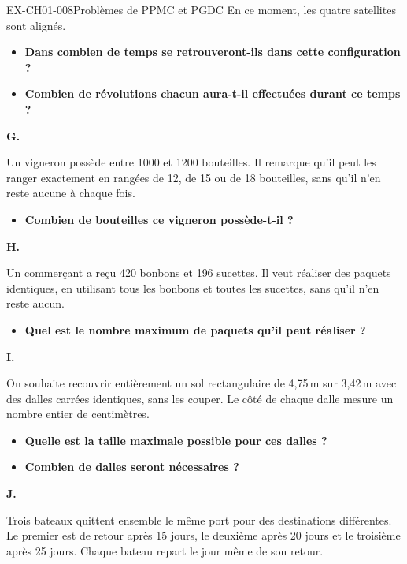 \begin{exercice}{EX-CH01-008}{Problèmes de PPMC et PGDC}
En ce moment, les quatre satellites sont alignés.

\begin{itemize}[label=$\blacktriangleright$]
\item \textbf{Dans combien de temps se retrouveront-ils dans cette configuration ?}
\item \textbf{Combien de révolutions chacun aura-t-il effectuées durant ce temps ?}
\end{itemize}

\bigskip\textbf{G.}

Un vigneron possède entre 1000 et 1200 bouteilles. Il remarque qu'il peut les ranger exactement en rangées de 12, de 15 ou de 18 bouteilles, sans qu'il n'en reste aucune à chaque fois.

\begin{itemize}[label=$\blacktriangleright$]
    \item \textbf{Combien de bouteilles ce vigneron possède-t-il ?}
\end{itemize}

\bigskip\textbf{H.}

\medskip
Un commerçant a reçu 420 bonbons et 196 sucettes. Il veut réaliser des paquets identiques, en utilisant tous les bonbons et toutes les sucettes, sans qu'il n'en reste aucun.

\begin{itemize}[label=$\blacktriangleright$]
    \item \textbf{Quel est le nombre maximum de paquets qu'il peut réaliser ?}
\end{itemize}

\bigskip\textbf{I.}

\medskip
On souhaite recouvrir entièrement un sol rectangulaire de 4,75\,m sur 3,42\,m avec des dalles carrées identiques, sans les couper.
Le côté de chaque dalle mesure un nombre entier de centimètres.

\begin{itemize}[label=$\blacktriangleright$]
    \item \textbf{Quelle est la taille maximale possible pour ces dalles ?}
    \item \textbf{Combien de dalles seront nécessaires ?}
\end{itemize}

\bigskip\textbf{J.}

\medskip
Trois bateaux quittent ensemble le même port pour des destinations différentes. Le premier est de retour après 15 jours, le deuxième après 20 jours et le troisième après 25 jours. Chaque bateau repart le jour même de son retour.


\end{exercice}
